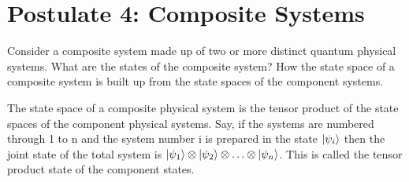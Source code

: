 \section{Postulate 4: Composite Systems}
Consider a composite system made up of two or more distinct quantum physical systems.
What are the states of the composite system? How the state space of a composite system is built up from the state spaces of the component 
systems.
\begin{definition}
    The state space of a composite physical system is the tensor product of the state spaces of the component physical systems. Say, 
    if the systems are numbered through 1 to n and the system number i is prepared in the state $\ket{\psi_i}$ then the joint
    state of the total system is $\ket{\psi_1}\otimes\ket{\psi_2}\otimes\ldots\otimes\ket{\psi_n}$. This is called the tensor product state of the component states.    
\end{definition}

